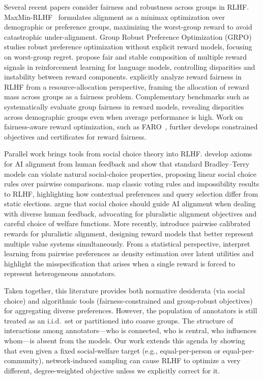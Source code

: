\documentclass{article}
\theoremstyle{plain}
\theoremstyle{definition}
\theoremstyle{remark}
\begin{document}
Several recent papers consider fairness and robustness across groups in RLHF.
MaxMin-RLHF~\citep{chakraborty2024maxminrlhf} formulates alignment as a minimax optimization over demographic or preference groups, maximizing the worst-group reward to avoid catastrophic under-alignment.
Group Robust Preference Optimization (GRPO)~\citep{ramesh2024grpo} studies robust preference optimization without explicit reward models, focusing on worst-group regret.
\citet{li2024optimizing_fair_stable} propose fair and stable composition of multiple reward signals in reinforcement learning for language models, controlling disparities and instability between reward components.
\citet{ouyang2025rewardfairness} explicitly analyze reward fairness in RLHF from a resource-allocation perspective, framing the allocation of reward mass across groups as a fairness problem.
Complementary benchmarks such as \citet{song2025groupfair_rewardmodels} systematically evaluate group fairness in reward models, revealing disparities across demographic groups even when average performance is high.
Work on fairness-aware reward optimization, such as FARO~\citep{choi2025faro}, further develops constrained objectives and certificates for reward fairness.

Parallel work brings tools from social choice theory into RLHF.
\citet{ge2024axioms} develop axioms for AI alignment from human feedback and show that standard Bradley--Terry models can violate natural social-choice properties, proposing linear social choice rules over pairwise comparisons.
\citet{dai2024mapping} map classic voting rules and impossibility results to RLHF, highlighting how contextual preferences and query selection differ from static elections.
\citet{conitzer2024socialchoice} argue that social choice should guide AI alignment when dealing with diverse human feedback, advocating for pluralistic alignment objectives and careful choice of welfare functions.
More recently, \citet{halpern2025pairwise_calibrated} introduce pairwise calibrated rewards for pluralistic alignment, designing reward models that better represent multiple value systems simultaneously.
From a statistical perspective, \citet{dumoulin2024density_pairwise} interpret learning from pairwise preferences as density estimation over latent utilities and highlight the misspecification that arises when a single reward is forced to represent heterogeneous annotators.

Taken together, this literature provides both normative desiderata (via social choice) and algorithmic tools (fairness-constrained and group-robust objectives) for aggregating diverse preferences.
However, the population of annotators is still treated as an i.i.d.\ set or partitioned into coarse groups.
The structure of interactions among annotators---who is connected, who is central, who influences whom---is absent from the models.
Our work extends this agenda by showing that even given a fixed social-welfare target (e.g., equal-per-person or equal-per-community), network-induced sampling can cause RLHF to optimize a very different, degree-weighted objective unless we explicitly correct for it.
\end{document}
